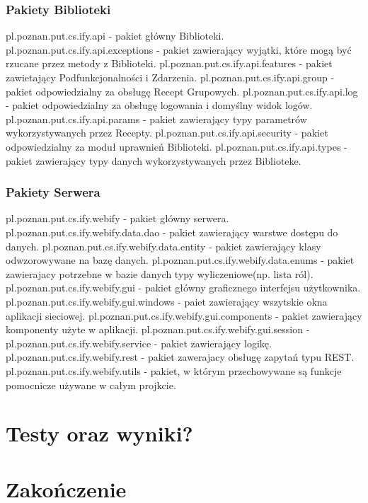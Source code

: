 \documentclass[11pt,a4paper,polish,thesis]{dcsbook}
\begin{document}
\subsection{Pakiety Biblioteki}
pl.poznan.put.cs.ify.api - pakiet główny Biblioteki.
pl.poznan.put.cs.ify.api.exceptions - pakiet zawierający wyjątki, które mogą być rzucane przez metody z Biblioteki.
pl.poznan.put.cs.ify.api.features - pakiet zawietający Podfunkcjonalności i Zdarzenia.
pl.poznan.put.cs.ify.api.group - pakiet odpowiedzialny za obsługę Recept Grupowych.
pl.poznan.put.cs.ify.api.log - pakiet odpowiedzialny za obsługę logowania i domyślny widok logów.
pl.poznan.put.cs.ify.api.params - pakiet zawierający typy parametrów wykorzystywanych przez Recepty.
pl.poznan.put.cs.ify.api.security - pakiet odpowiedzialny za moduł uprawnień Biblioteki.
pl.poznan.put.cs.ify.api.types - pakiet zawierający typy danych wykorzystywanych przez Biblioteke.
\subsection{Pakiety Serwera}
pl.poznan.put.cs.ify.webify - pakiet główny serwera.
pl.poznan.put.cs.ify.webify.data.dao - pakiet zawierający warstwe dostępu do danych.
pl.poznan.put.cs.ify.webify.data.entity - pakiet zawierający klasy odwzorowywane na bazę danych.
pl.poznan.put.cs.ify.webify.data.enums - pakiet zawierajacy potrzebne w bazie danych typy wyliczeniowe(np. lista ról). 
pl.poznan.put.cs.ify.webify.gui - pakiet główny graficznego interfejsu użytkownika.
pl.poznan.put.cs.ify.webify.gui.windows - paiet zawierający wszytskie okna aplikacji sieciowej.
pl.poznan.put.cs.ify.webify.gui.components - pakiet zawierający komponenty użyte w aplikacji.
pl.poznan.put.cs.ify.webify.gui.session - 
pl.poznan.put.cs.ify.webify.service - pakiet zawierający logikę.
pl.poznan.put.cs.ify.webify.rest - pakiet zawerajacy obsługę zapytań typu REST.
pl.poznan.put.cs.ify.webify.utils - pakiet, w którym przechowywane są funkcje pomocnicze używane w całym projkcie.

\chapter{Testy oraz wyniki?}
\chapter{Zakończenie}
\end{document}

